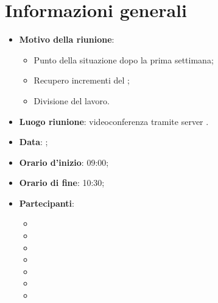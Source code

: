 \section{Informazioni generali}
\begin{itemize}
\item \textbf{Motivo della riunione}: 
\begin{itemize}
\item Punto della situazione dopo la prima settimana;
\item Recupero incrementi del \PdP{};
\item Divisione del lavoro.
\end{itemize}
\item \textbf{Luogo riunione}: videoconferenza tramite server .
\item \textbf{Data}: \Data{};
\item \textbf{Orario d'inizio}: 09:00;
\item \textbf{Orario di fine}: 10:30;
\item \textbf{Partecipanti}:
	\begin{itemize}
	\item \SG{}
	\item \BM{}
	\item \SP{}
	\item \RA{}
	\item \SH{}
	\item \PA{}
	\item \ZM{}
	\end{itemize}
\end{itemize}

\newpage
